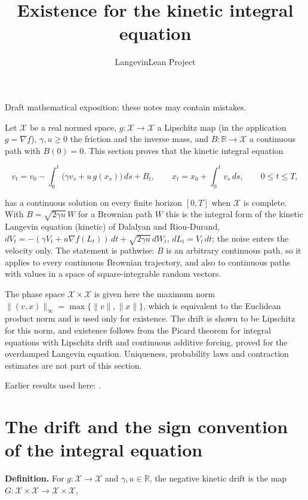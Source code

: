 \documentclass[11pt,a4paper]{article}
\title{\texorpdfstring{Existence for the kinetic integral equation}{Existence for the kinetic integral equation}}
\author{LangevinLean Project}
\date{}
\begin{document}
\maketitle
Draft mathematical exposition; these notes may contain mistakes.


Let \(\mathcal X\) be a real normed space, \(g:\mathcal X\to\mathcal X\) a Lipschitz map (in the application \(g=\nabla f\)), \(\gamma,u\ge0\) the friction and the inverse mass, and \(B:\mathbb R\to\mathcal X\) a continuous path with \(B(0)=0\). This section proves that the kinetic integral equation


\[v_t=v_0-\int_0^t\bigl(\gamma v_s+u\,g(x_s)\bigr)\,ds+B_t,\qquad x_t=x_0+\int_0^tv_s\,ds,\qquad 0\le t\le T,\]


has a continuous solution on every finite horizon \([0,T]\) when \(\mathcal X\) is complete. With \(B=\sqrt{2\gamma u}\,W\) for a Brownian path \(W\) this is the integral form of the kinetic Langevin equation (kinetic) of Dalalyan and Riou-Durand, \(dV_t=-(\gamma V_t+u\nabla f(L_t))\,dt+\sqrt{2\gamma u}\,dW_t\), \(dL_t=V_t\,dt\); the noise enters the velocity only. The statement is pathwise: \(B\) is an arbitrary continuous path, so it applies to every continuous Brownian trajectory, and also to continuous paths with values in a space of square-integrable random vectors.




The phase space \(\mathcal X\times\mathcal X\) is given here the maximum norm \(\|(v,x)\|_\infty=\max\{\|v\|,\|x\|\}\), which is equivalent to the Euclidean product norm and is used only for existence. The drift is shown to be Lipschitz for this norm, and existence follows from the Picard theorem for integral equations with Lipschitz drift and continuous additive forcing, proved for the overdamped Langevin equation. Uniqueness, probability laws and contraction estimates are not part of this section.



Earlier results used here: \cite[Section~3.14]{LangevinLean2026ULASC}.

\section{\texorpdfstring{The drift and the sign convention of the integral equation}{The drift and the sign convention of the integral equation}}


\textbf{Definition.} For \(g:\mathcal X\to\mathcal X\) and \(\gamma,u\in\mathbb R\), the negative kinetic drift is the map \(G:\mathcal X\times\mathcal X\to\mathcal X\times\mathcal X\),
\end{document}
